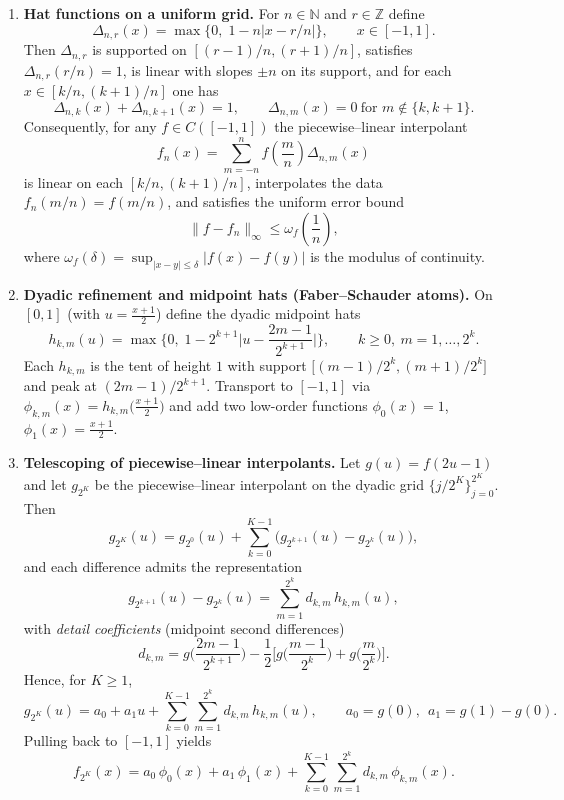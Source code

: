 \documentclass[12pt,a4paper]{article}
\theoremstyle{plain}
\theoremstyle{definition}
\theoremstyle{remark}
\theoremstyle{remark}
\begin{document}
\begin{enumerate}[label=(\alph*), leftmargin=*, itemsep=0.5em]
	\item \textbf{Hat functions on a uniform grid.}
	For $n\in\mathbb{N}$ and $r\in\mathbb{Z}$ define
	\[
	\Delta_{n,r}(x)=\max\!\{0,\;1-n\lvert x-r/n\rvert\},\qquad x\in[-1,1].
	\]
	Then $\Delta_{n,r}$ is supported on $[(r-1)/n,(r+1)/n]$, satisfies
	$\Delta_{n,r}(r/n)=1$, is linear with slopes $\pm n$ on its support, and for each
	$x\in[k/n,(k+1)/n]$ one has
	\[
	\Delta_{n,k}(x)+\Delta_{n,k+1}(x)=1,\qquad
	\Delta_{n,m}(x)=0\ \text{for } m\notin\{k,k+1\}.
	\]
	Consequently, for any $f\in C([-1,1])$ the piecewise–linear interpolant
	\[
	f_n(x)=\sum_{m=-n}^{n} f\!\left(\frac{m}{n}\right)\Delta_{n,m}(x)
	\]
	is linear on each $[k/n,(k+1)/n]$, interpolates the data $f_n(m/n)=f(m/n)$, and
	satisfies the uniform error bound
	\[
	\|f-f_n\|_\infty\le \omega_f\!\left(\frac{1}{n}\right),
	\]
	where $\omega_f(\delta)=\sup_{|x-y|\le \delta}|f(x)-f(y)|$ is the modulus of continuity.
	
	\item \textbf{Dyadic refinement and midpoint hats (Faber–Schauder atoms).}
	On $[0,1]$ (with $u=\frac{x+1}{2}$) define the dyadic midpoint hats
	\[
	h_{k,m}(u)=\max\!\Big\{0,\;1-2^{k+1}\Big|u-\frac{2m-1}{2^{k+1}}\Big|\Big\},
	\qquad k\ge 0,\ m=1,\dots,2^{k}.
	\]
	Each $h_{k,m}$ is the tent of height $1$ with support
	$\big[(m-1)/2^{k},(m+1)/2^{k}\big]$ and peak at $(2m-1)/2^{k+1}$.
	Transport to $[-1,1]$ via $\phi_{k,m}(x)=h_{k,m}\big(\frac{x+1}{2}\big)$ and add two
	low-order functions $\phi_0(x)=1$, $\phi_1(x)=\frac{x+1}{2}$.
	
	\item \textbf{Telescoping of piecewise–linear interpolants.}
	Let $g(u)=f(2u-1)$ and let $g_{2^K}$ be the piecewise–linear interpolant on the dyadic
	grid $\{j/2^K\}_{j=0}^{2^K}$. Then
	\[
	g_{2^{K}}(u)
	= g_{2^{0}}(u)
	+ \sum_{k=0}^{K-1}\big(g_{2^{k+1}}(u)-g_{2^{k}}(u)\big),
	\]
	and each difference admits the representation
	\[
	g_{2^{k+1}}(u)-g_{2^{k}}(u)
	= \sum_{m=1}^{2^{k}} d_{k,m}\,h_{k,m}(u),
	\]
	with \emph{detail coefficients} (midpoint second differences)
	\[
	d_{k,m}
	= g\!\Big(\frac{2m-1}{2^{k+1}}\Big)
	-\frac{1}{2}\Bigg[
	g\!\Big(\frac{m-1}{2^{k}}\Big)
	+ g\!\Big(\frac{m}{2^{k}}\Big)\Bigg].
	\]
	Hence, for $K\ge1$,
	\[
	g_{2^{K}}(u) = a_0 + a_1 u + \sum_{k=0}^{K-1}\sum_{m=1}^{2^{k}} d_{k,m}\,h_{k,m}(u),
	\qquad a_0=g(0),\ \ a_1=g(1)-g(0).
	\]
	Pulling back to $[-1,1]$ yields
	\[
	f_{2^{K}}(x)= a_0\,\phi_0(x)+a_1\,\phi_1(x)
	+ \sum_{k=0}^{K-1}\sum_{m=1}^{2^{k}} d_{k,m}\,\phi_{k,m}(x).
	\]
	

\end{enumerate}
\end{document}
